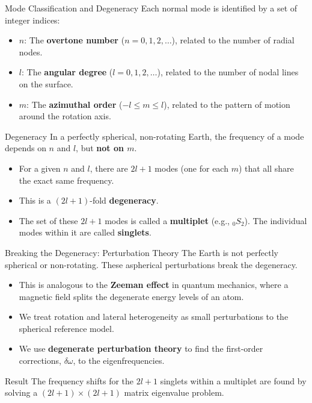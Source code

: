 \documentclass{beamer}
\begin{document}
\begin{frame}{Mode Classification and Degeneracy}
    Each normal mode is identified by a set of integer indices:
    \begin{itemize}
        \item $ n $: The \textbf{overtone number} ($n=0, 1, 2, \dots$), related to the number of radial nodes.
        \item $ l $: The \textbf{angular degree} ($l=0, 1, 2, \dots$), related to the number of nodal lines on the surface.
        \item $ m $: The \textbf{azimuthal order} ($-l \le m \le l$), related to the pattern of motion around the rotation axis.
    \end{itemize}
    \pause
    \begin{alertblock}{Degeneracy}
        In a perfectly spherical, non-rotating Earth, the frequency of a mode depends on $n$ and $l$, but \textbf{not on $m$}.
        \begin{itemize}
            \item For a given $n$ and $l$, there are $2l+1$ modes (one for each $m$) that all share the exact same frequency.
            \item This is a $(2l+1)$-fold \textbf{degeneracy}.
            \item The set of these $2l+1$ modes is called a \textbf{multiplet} (e.g., ${}_0S_2$). The individual modes within it are called \textbf{singlets}.
        \end{itemize}
    \end{alertblock}
\end{frame}


\begin{frame}{Breaking the Degeneracy: Perturbation Theory}
    The Earth is not perfectly spherical or non-rotating. These aspherical perturbations break the degeneracy.
    \begin{itemize}
        \item This is analogous to the \textbf{Zeeman effect} in quantum mechanics, where a magnetic field splits the degenerate energy levels of an atom.
        \pause
        \item We treat rotation and lateral heterogeneity as small perturbations to the spherical reference model.
        \pause
        \item We use \textbf{degenerate perturbation theory} to find the first-order corrections, $\delta\omega$, to the eigenfrequencies.
    \end{itemize}
    \pause
    \begin{block}{Result}
        The frequency shifts for the $2l+1$ singlets within a multiplet are found by solving a $(2l+1) \times (2l+1)$ matrix eigenvalue problem.
    \end{block}
\end{frame}
\end{document}
